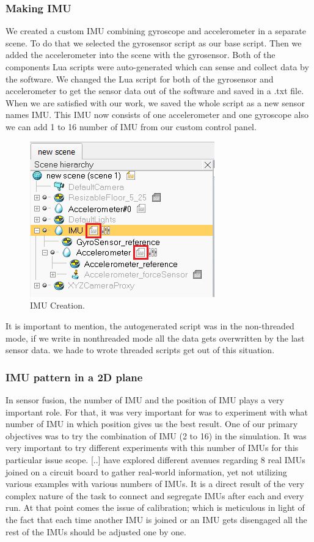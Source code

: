 \subsubsection{Making IMU}

We created a custom IMU combining gyroscope and accelerometer in a separate scene. To do that we selected the gyrosensor script as our base script. Then we added the accelerometer into the scene with the gyrosensor. Both of the components Lua scripts were auto-generated which can sense and collect data by the software. We changed the Lua script for both of the gyrosensor and accelerometer to get the sensor data out of the software and saved in a .txt file. When we are satisfied with our work, we saved the whole script as a new sensor names IMU. This IMU now consists of one accelerometer and one gyroscope also we can add 1  to 16 number of IMU from our custom control panel.

\begin{figure}[h]
  \centering
    \includegraphics[width=8cm]{figures/IMU_Creation.png}
    \caption{IMU Creation.}
\end{figure}

It is important to mention, the autogenerated script was in the non-threaded mode, if we write in nonthreaded mode all the data gets overwritten by the last sensor data. we hade to wrote threaded scripts get out of this situation.

\subsubsection{IMU pattern in a 2D plane}

In sensor fusion, the number of IMU and the position of IMU plays a very important role. For that, it was very important for was to experiment with what number of IMU in which position gives us the best result. One of our primary objectives was to try the combination of IMU (2 to 16) in the simulation. 
It was very important to try different experiments with this number of IMUs for this particular issue scope. 
[..] have explored different avenues regarding 8 real IMUs joined on a circuit board to gather real-world information, yet not utilizing various examples with various numbers of IMUs. It is a direct result of the very complex nature of the task to connect and segregate IMUs after each and every run. At that point comes the issue of calibration; which is meticulous in light of the fact that each time another IMU is joined or an IMU gets disengaged all the rest of the IMUs should be adjusted one by one.

